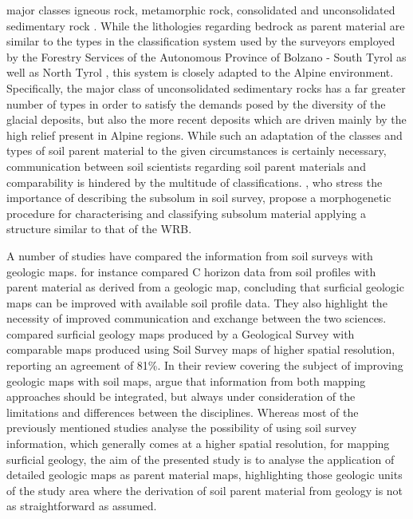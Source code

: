 \documentclass[preprint,12pt,authoryear]{elsarticle}
\begin{document}
major classes igneous rock, metamorphic rock, consolidated and unconsolidated sedimentary rock \citep{FAO2006}. While the lithologies regarding bedrock as parent material are similar to the types in the classification system used by the surveyors employed by the Forestry Services of the Autonomous Province of Bolzano - South Tyrol as well as North Tyrol \citep{Englisch1998,waldtypisierungTirol}, this system is closely adapted to the Alpine environment. Specifically, the major class of unconsolidated sedimentary rocks has a far greater number of types in order to satisfy the demands posed by the diversity of the glacial deposits, but also the more recent deposits which are driven mainly by the high relief present in Alpine regions.
While such an adaptation of the classes and types of soil parent material to the given circumstances is certainly necessary, communication between soil scientists regarding soil parent materials and comparability is hindered by the multitude of classifications. \cite{Juilleret2016}, who stress the importance of describing the subsolum in soil survey, propose a morphogenetic procedure for characterising and classifying subsolum material applying a structure similar to that of the WRB. 

A number of studies have compared the information from soil surveys with geologic maps. \cite{Juilleret2012} for instance compared  C horizon data from soil profiles with parent material as derived from a geologic map, concluding that surficial geologic maps can be improved with available soil profile data. They also highlight the necessity of improved communication and exchange between the two sciences.  \cite{Miller2015a} compared surficial geology maps produced by a Geological Survey with comparable maps produced using Soil Survey maps of higher spatial resolution, reporting an agreement of 81\%. In their review covering the subject of improving geologic maps with soil maps, \cite{Brevik2015} argue that information from both mapping approaches should be integrated, but always under consideration of the limitations and differences between the disciplines. Whereas most of the previously mentioned studies analyse the possibility of using soil survey information, which generally comes at a higher spatial resolution, for mapping surficial geology, the aim of the presented study is to analyse the application of detailed geologic maps as parent material maps, highlighting those geologic units of the study area where the derivation of soil parent material from geology is not as straightforward as assumed.
\end{document}
